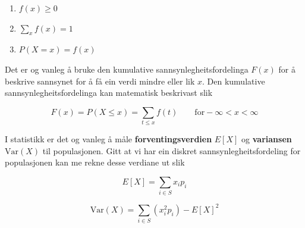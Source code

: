 \begin{enumerate}
    \item $f(x) \geq 0$
    \item $\sum_x f(x) = 1$
    \item $P(X = x) = f(x)$
\end{enumerate}

Det er og vanleg å bruke den kumulative sannsynlegheitsfordelinga $F(x)$ for å beskrive sannsynet for å få ein verdi mindre eller lik $x$. Den kumulative sannsynlegheitsfordelinga kan matematisk beskrivast slik

\begin{equation}
    F(x) = P(X \leq x) = \sum_{t \leq x} f(t) \qquad \text{for} -\infty < x < \infty
\end{equation}

I statistikk er det og vanleg å måle \textbf{forventingsverdien} $E[X]$ og \textbf{variansen} $\text{Var}(X)$ til populasjonen. Gitt at vi har ein diskret sannsynlegheitsfordeling for populasjonen kan me rekne desse verdiane ut slik

\begin{equation}
    E[X] = \sum_{i \in S} x_i p_i
\end{equation}

\begin{equation}
    \text{Var}(X) = \sum_{i \in S} \left( x_i^2 p_i \right) - E[X]^2
\end{equation}

